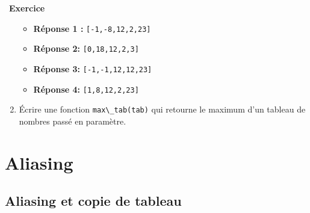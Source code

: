 \documentclass[
  11pt,
]{article}
\newcommand{\passthrough}[1]{#1}
\providecommand{\tightlist}{%
  \setlength{\itemsep}{0pt}\setlength{\parskip}{0pt}}
\newcounter{exo}
\newenvironment{exercice}[1]
{\par \medskip   \addtocounter{exo}{1} \noindent  
\begin{bclogo}[arrondi =0.1,   noborder = true, logo=\bccrayon, marge=4]{~\textbf{Exercice} \textbf{\theexo} {\itshape #1} }  \par}
{
\end{bclogo}
 \par \bigskip }
\begin{document}
\begin{exercice}{}
\begin{enumerate}
  \begin{itemize}
  \tightlist
  \item
    \textbf{Réponse 1 :} \passthrough{\lstinline![-1,-8,12,2,23]!}
  \item
    \textbf{Réponse 2:} \passthrough{\lstinline![0,18,12,2,3]!}
  \item
    \textbf{Réponse 3:} \passthrough{\lstinline![-1,-1,12,12,23]!}
  \item
    \textbf{Réponse 4:} \passthrough{\lstinline![1,8,12,2,23]!}
  \end{itemize}
\item
  Écrire une fonction \passthrough{\lstinline!max\_tab(tab)!} qui
  retourne le maximum d'un tableau de nombres passé en paramètre.
\end{enumerate}

\end{exercice}

\hypertarget{aliasing}{%
\section{Aliasing}\label{aliasing}}

\hypertarget{aliasing-et-copie-de-tableau}{%
\subsection{Aliasing et copie de
tableau}\label{aliasing-et-copie-de-tableau}}
\end{document}
